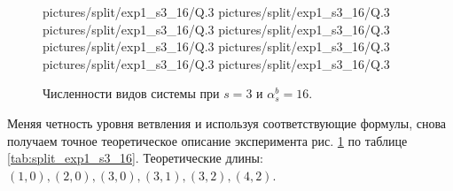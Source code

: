 \begin{figure}[H]
    \centering
       {pictures/split/exp1_s3_16/Q}{.3}
      {pictures/split/exp1_s3_16/Q}{.3}
      {pictures/split/exp1_s3_16/Q}{.3}
      {pictures/split/exp1_s3_16/Q}{.3}
      {pictures/split/exp1_s3_16/Q}{.3}
      {pictures/split/exp1_s3_16/Q}{.3}
     {pictures/split/exp1_s3_16/Q}{.3}
     {pictures/split/exp1_s3_16/Q}{.3}
\caption{Численности видов системы при \(s=3\) и \(\alpha^b_s = 16\).} \label{fig:split_exp1_s3_16}
\end{figure}
Меняя четность уровня ветвления и используя соответствующие формулы, снова получаем точное теоретическое описание эксперимента рис. \ref{fig:split_exp1_s3_16} по таблице \ref{tab:split_exp1_s3_16}. Теоретические длины: \( (1,0), (2,0), (3,0), (3,1), (3,2), (4,2) \).


